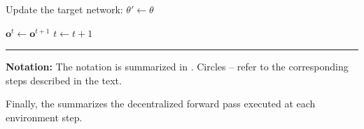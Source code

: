 \begin{algorithm}[H]
\begin{algorithmic}[1]
                    \State Update the target network:
                        $\theta' \gets \theta$
                \EndIf

                \State $\mathbf{o}^t \gets \mathbf{o}^{t+1}$
                \State $t \gets t+1$
            \EndWhile
        \EndFor
    \end{algorithmic}

    \vspace{2pt}
    \hrule
    \vspace{4pt}

    {\small
        \textbf{Notation:}
        The notation is summarized in .
        Circles -- refer to the
        corresponding steps described in the text.
    }
\end{algorithm}

Finally, 
 the  summarizes the decentralized forward pass executed 
 at each environment step.


